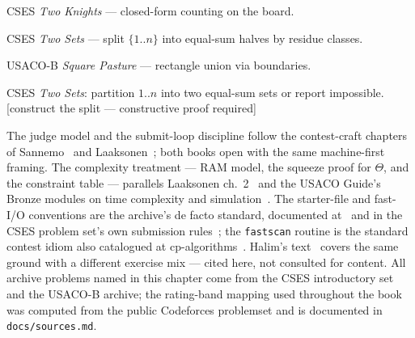 \begin{exercise}[easy] CSES \emph{Two Knights} --- closed-form counting on the board. \end{exercise}
\begin{exercise}[medium] CSES \emph{Two Sets} --- split $\{1..n\}$ into equal-sum halves by residue classes. \end{exercise}
\begin{exercise}[medium] USACO-B \emph{Square Pasture} --- rectangle union via boundaries. \end{exercise}
\begin{exercise}[hard] CSES \emph{Two Sets}: partition $1..n$ into two
equal-sum sets or report impossible. [construct the split --- constructive
proof required]
\end{exercise}

\chapternotes
The judge model and the submit-loop discipline follow the contest-craft
chapters of Sannemo~\cite{sannemo2025} and Laaksonen~\cite{laaksonen2024};
both books open with the same machine-first framing. The complexity
treatment --- RAM model, the squeeze proof for $\Theta$, and the
constraint table --- parallels Laaksonen ch.~2~\cite{laaksonen2024} and the
USACO Guide's Bronze modules on time complexity and
simulation~\cite{usacoguide}. The starter-file and fast-I/O conventions are
the archive's de facto standard, documented at~\cite{cppreference} and in
the CSES problem set's own submission rules~\cite{cses}; the
\texttt{fastscan} routine is the standard contest idiom also catalogued at
cp-algorithms~\cite{cpalgorithms}. Halim's text~\cite{halimcp4} covers the
same ground with a different exercise mix --- cited here, not consulted for
content. All archive problems named in this chapter come from the CSES
introductory set and the USACO-B archive; the rating-band mapping used
throughout the book was computed from the public Codeforces problemset and
is documented in \texttt{docs/sources.md}.

